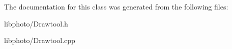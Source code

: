 The documentation for this class was generated from the following files\-:\begin{DoxyCompactItemize}
\item 
libphoto/Drawtool.\-h\item 
libphoto/Drawtool.\-cpp\end{DoxyCompactItemize}
